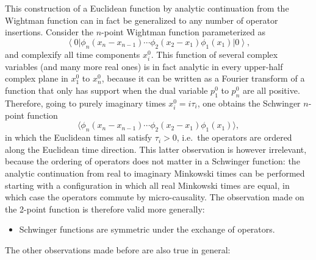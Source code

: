 \documentclass[a4paper,12pt]{article}
\newcommand{\ket}[1]{\left| #1 \right\rangle}
\newcommand{\bra}[1]{\left\langle #1 \right|}
\numberwithin{equation}{section}
\begin{document}
This construction of a Euclidean function by analytic continuation from the Wightman function can in fact be generalized to any number of operator insertions. Consider the $n$-point Wightman function parameterized as
\begin{equation}
	\bra{0} \phi_n(x_n - x_{n-1}) \cdots
	\phi_2(x_2 - x_1) \phi_1(x_1) \ket{0},
\end{equation}
and complexify all time components $x_i^0$. This function of several complex variables (and many more real ones) is in fact analytic in every upper-half complex plane in $x_1^0$ to $x_n^0$, because it can be written as a Fourier transform of a function that only has support when the dual variable $p_1^0$ to $p_n^0$ are all positive. Therefore, going to purely imaginary times $x_i^0 = i \tau_i$, one obtains the Schwinger $n$-point function
\begin{equation}
	\langle \phi_n(x_n - x_{n-1}) \cdots
	\phi_2(x_2 - x_1) \phi_1(x_1) \rangle,
\end{equation}
in which the Euclidean times all satisfy $\tau_i > 0$, i.e.~the operators are ordered along the Euclidean time direction. 
This latter observation is however irrelevant, because the ordering of operators does not matter in a Schwinger function: the analytic continuation from real to imaginary Minkowski times can be performed starting with a configuration in which all real Minkowski times are equal, in which case the operators commute by micro-causality. 
The observation made on the 2-point function is therefore valid more generally: 
\begin{itemize}

\item
Schwinger functions are symmetric under the exchange of operators.

\end{itemize} 
The other observations made before are also true in general: 
\end{document}
